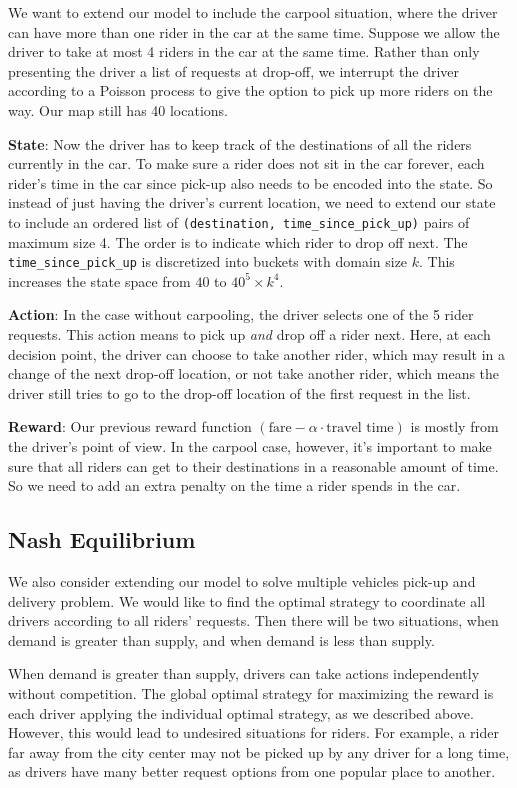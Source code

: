 \documentclass{article}
\begin{document}
We want to extend our model to include the carpool situation, where the driver can have more than one rider in the car at the same time. Suppose we allow the driver to take at most 4 riders in the car at the same time. Rather than only presenting the driver a list of requests at drop-off, we interrupt the driver according to a Poisson process to give the option to pick up more riders on the way. Our map still has 40 locations.

\textbf{State}:
Now the driver has to keep track of the destinations of all the riders currently in the car. To make sure a rider does not sit in the car forever, each rider's time in the car since pick-up also needs to be encoded into the state. So instead of just having the driver's current location, we need to extend our state to include an ordered list of \texttt{(destination, time\_since\_pick\_up)} pairs of maximum size 4. The order is to indicate which rider to drop off next. The \texttt{time\_since\_pick\_up} is discretized into buckets with domain size $k$. This increases the state space from $40$ to $40^{5}\times k^{4}$.

\textbf{Action}:
In the case without carpooling, the driver selects one of the 5 rider requests. This action means to pick up \textit{and} drop off a rider next. Here, at each decision point, the driver can choose to take another rider, which may result in a change of the next drop-off location, or not take another rider, which means the driver still tries to go to the drop-off location of the first request in the list.

\textbf{Reward}:
Our previous reward function $(\text{fare}-\alpha\cdot\text{travel time})$ is mostly from the driver's point of view. In the carpool case, however, it's important to make sure that all riders can get to their destinations in a reasonable amount of time. So we need to add an extra penalty on the time a rider spends in the car.

\subsection{Nash Equilibrium}
We also consider extending our model to solve multiple vehicles pick-up and delivery problem. We would like to find the optimal strategy to coordinate all drivers according to all riders' requests. Then there will be two situations, when demand is greater than supply, and when demand is less than supply.

When demand is greater than supply, drivers can take actions independently without competition. The global optimal strategy for maximizing the reward is each driver applying the individual optimal strategy, as we described above. However, this would lead to undesired situations for riders. For example, a rider far away from the city center may not be picked up by any driver for a long time, as drivers have many better request options from one popular place to another.
\end{document}
